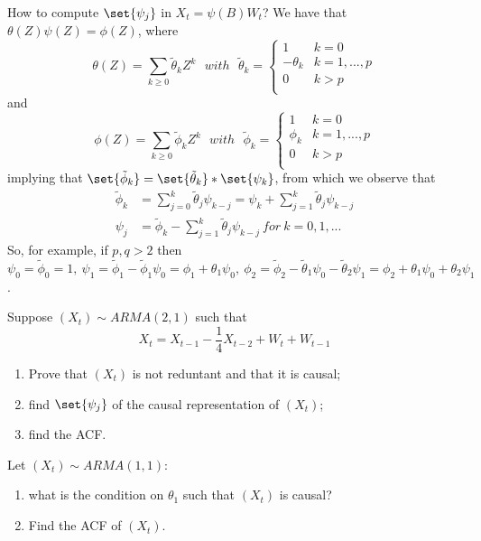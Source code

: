 How to compute $\set{\psi_j}$ in $X_t=\psi(B)W_t$? We have that $\theta(Z)\psi(Z)=\phi(Z)$, where
\[
    \theta(Z)=\sum_{k\ge0}\tilde{\theta}_kZ^k\ \ \ with\ \ \ \tilde{\theta}_k=
    \begin{cases}
        1&k=0\\
        -\theta_k&k=1,...,p\\
        0&k>p\\
    \end{cases}  
\]
and
\[
    \phi(Z)=\sum_{k\ge0}\tilde{\phi}_kZ^k\ \ \ with\ \ \ \tilde{\phi}_k=
    \begin{cases}
        1&k=0\\
        \phi_k&k=1,...,p\\
        0&k>p\\
    \end{cases}   
\]
implying that $\set{\tilde{\phi}_k}=\set{\tilde{\theta}_k}*\set{\psi_k}$, from which we observe that
\begin{equation}
    \begin{split}
        \tilde{\phi}_k&=\sum_{j=0}^k\tilde{\theta}_j\psi_{k-j}=\psi_k+\sum_{j=1}^k\tilde{\theta}_j\psi_{k-j}\\
        \psi_j&=\tilde{\phi}_k-\sum_{j=1}^k\tilde{\theta}_j\psi_{k-j}\ for\ k=0,1,...
    \end{split}
\end{equation}
So, for example, if $p,q>2$ then $\psi_0=\tilde{\phi}_0=1,\ \psi_1=\tilde{\phi}_1-\tilde{\phi}_1\psi_0=\phi_1+\theta_1\psi_0,\ \phi_2=\tilde{\phi}_2-\tilde{\theta}_1\psi_0-\tilde{\theta}_2\psi_1=\phi_2+\theta_1\psi_0+\theta_2\psi_1$.

\begin{exercise}
    Suppose $(X_t)\sim ARMA(2,1)$ such that 
    \[
        X_t=X_{t-1}-\frac{1}{4}X_{t-2}+W_t+W_{t-1}  
    \]
    \begin{enumerate}
        \item Prove that $(X_t)$ is not reduntant and that it is causal;
        \item find $\set{\psi_j}$ of the causal representation of $(X_t)$;
        \item find the ACF.
    \end{enumerate}
\end{exercise}

\begin{exercise}
    Let $(X_t)\sim ARMA(1,1)$:
    \begin{enumerate}
        \item what is the condition on $\theta_1$ such that $(X_t)$ is causal?
        \item Find the ACF of $(X_t)$.
    \end{enumerate}
\end{exercise}

